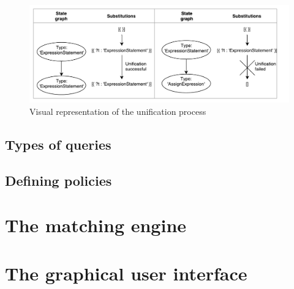 \begin{figure}[!ht]
    \centering
      \includegraphics[width=1\textwidth]{images/Unification} 
      \caption{Visual representation of the unification process}
    \label{fig:Unification}
\end{figure}




\subsection{Types of queries}
\label{subsec:TypesOfQueries}
\subsection{Defining policies}
\label{subsec:DefiningPolicies}
\section{The matching engine} 
\label{sec:matchingEngine} %
\section{The graphical user interface} 
\label{sec:GUI}
